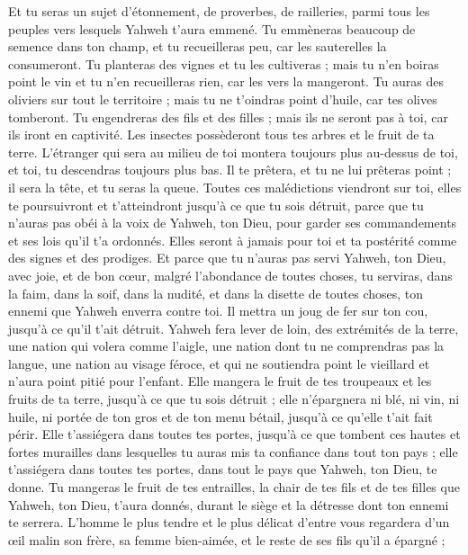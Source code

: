 \begin{multicols}{2}
Et tu seras un sujet d'étonnement, de proverbes, de railleries, parmi tous les peuples vers lesquels Yahweh t'aura emmené.
Tu emmèneras beaucoup de semence dans ton champ, et tu recueilleras peu, car les sauterelles la consumeront.
Tu planteras des vignes et tu les cultiveras ; mais tu n'en boiras point le vin et tu n'en recueilleras rien, car les vers la mangeront.
Tu auras des oliviers sur tout le territoire ; mais tu ne t'oindras point d'huile, car tes olives tomberont.
Tu engendreras des fils et des filles ; mais ils ne seront pas à toi, car ils iront en captivité.
Les insectes possèderont tous tes arbres et le fruit de ta terre.
L'étranger qui sera au milieu de toi montera toujours plus au-dessus de toi, et toi, tu descendras toujours plus bas.
Il te prêtera, et tu ne lui prêteras point ; il sera la tête, et tu seras la queue.
Toutes ces malédictions viendront sur toi, elles te poursuivront et t'atteindront jusqu'à ce que tu sois détruit, parce que tu n'auras pas obéi à la voix de Yahweh, ton Dieu, pour garder ses commandements et ses lois qu'il t'a ordonnés.
Elles seront à jamais pour toi et ta postérité comme des signes et des prodiges.
Et parce que tu n'auras pas servi Yahweh, ton Dieu, avec joie, et de bon cœur, malgré l'abondance de toutes choses,
tu serviras, dans la faim, dans la soif, dans la nudité, et dans la disette de toutes choses, ton ennemi que Yahweh enverra contre toi. Il mettra un joug de fer sur ton cou, jusqu'à ce qu'il t'ait détruit.
Yahweh fera lever de loin, des extrémités de la terre, une nation qui volera comme l'aigle, une nation dont tu ne comprendras pas la langue,
une nation au visage féroce, et qui ne soutiendra point le vieillard et n’aura point pitié pour l'enfant\FTNT{}.
Elle mangera le fruit de tes troupeaux et les fruits de ta terre, jusqu'à ce que tu sois détruit ; elle n’épargnera ni blé, ni vin, ni huile, ni portée de ton gros et de ton menu bétail, jusqu'à ce qu'elle t'ait fait périr.
Elle t'assiégera dans toutes tes portes, jusqu'à ce que tombent ces hautes et fortes murailles dans lesquelles tu auras mis ta confiance dans tout ton pays ; elle t’assiégera dans toutes tes portes, dans tout le pays que Yahweh, ton Dieu, te donne.
Tu mangeras le fruit de tes entrailles, la chair de tes fils et de tes filles que Yahweh, ton Dieu, t'aura donnés, durant le siège et la détresse dont ton ennemi te serrera.
L'homme le plus tendre et le plus délicat d'entre vous regardera d'un œil malin son frère, sa femme bien-aimée, et le reste de ses fils qu'il a épargné ;

\end{multicols}
